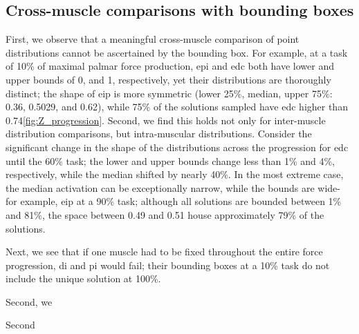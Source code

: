 \subsection{Cross-muscle comparisons with bounding boxes} %
\label{sub:cross_muscle_comparisons_with_bounding_boxes}
First, we observe that a meaningful cross-muscle comparison of point distributions cannot be ascertained by the bounding box. For example, at a task of 10\% of maximal palmar force production, epi and edc both have lower and upper bounds of 0, and 1, respectively, yet their distributions are thoroughly distinct; the shape of eip is more symmetric (lower 25\%, median, upper 75\%: 0.36, 0.5029, and 0.62), while 75\% of the solutions sampled have edc higher than 0.74\ref{fig:Z_progression}. 
Second, we find this holds not only for inter-muscle distribution comparisons, but intra-muscular distributions. Consider the significant change in the shape of the distributions across the progression for edc until the 60\% task; the lower and upper bounds change less than 1\% and 4\%, respectively, while the median shifted by nearly 40\%. In the most extreme case, the median activation can be exceptionally narrow, while the bounds are wide- for example, eip at a 90\% task; although all solutions are bounded between 1\% and 81\%, the space between 0.49 and 0.51 house approximately 79\% of the solutions.

Next, we see that if one muscle had to be fixed throughout the entire force progression, di and pi would fail; their bounding boxes at a 10\% task do not include the unique solution at 100\%. 



Second, we 

Second

